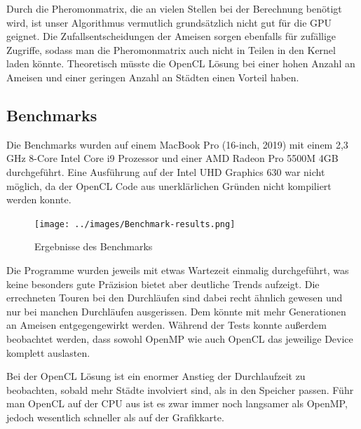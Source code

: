 Durch die Pheromonmatrix, die an vielen Stellen bei der Berechnung benötigt wird, ist unser Algorithmus vermutlich grundsätzlich nicht gut für die GPU geignet.
Die Zufallsentscheidungen der Ameisen sorgen ebenfalls für zufällige Zugriffe, sodass man die Pheromonmatrix auch nicht in Teilen in den Kernel laden könnte.
Theoretisch müsste die OpenCL Lösung bei einer hohen Anzahl an Ameisen und einer geringen Anzahl an Städten einen Vorteil haben.


\subsection{Benchmarks}

Die Benchmarks wurden auf einem MacBook Pro (16-inch, 2019) mit einem 2,3 GHz 8-Core Intel Core i9 Prozessor und einer AMD Radeon Pro 5500M 4GB durchgeführt.
Eine Ausführung auf der Intel UHD Graphics 630 war nicht möglich, da der OpenCL Code aus unerklärlichen Gründen nicht kompiliert werden konnte.

\begin{figure}[h]
    \centering
    \texttt{[image: ../images/Benchmark-results.png]}
    \caption{Ergebnisse des Benchmarks}
    \label{fig:benchmark-results}
\end{figure}

Die Programme wurden jeweils mit etwas Wartezeit einmalig durchgeführt, was keine besonders gute Präzision bietet aber deutliche Trends aufzeigt.
Die errechneten Touren bei den Durchläufen sind dabei recht ähnlich gewesen und nur bei manchen Durchläufen ausgerissen. 
Dem könnte mit mehr Generationen an Ameisen entgegengewirkt werden. 
Während der Tests konnte außerdem beobachtet werden, dass sowohl OpenMP wie auch OpenCL das jeweilige Device komplett auslasten.

Bei der OpenCL Lösung ist ein enormer Anstieg der Durchlaufzeit zu beobachten, sobald mehr Städte involviert sind, als in den Speicher passen.
Führ man OpenCL auf der CPU aus ist es zwar immer noch langsamer als OpenMP, jedoch wesentlich schneller als auf der Grafikkarte. 